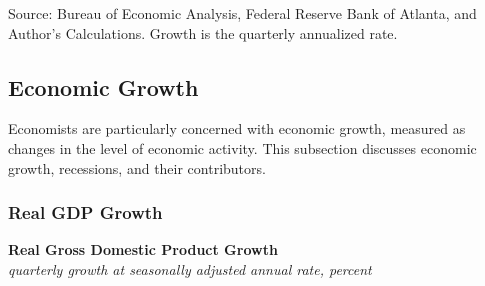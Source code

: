 \documentclass{report}
\makeatletter
\newcommand{\tbllink}[1]{\href{https://raw.githubusercontent.com/bdecon/US-chartbook/master/chartbook/data/#1}{\faTable}}
\newcommand*\short[1]{\expandafter\@gobbletwo\number\numexpr#1\relax}
\newcommand{\tsbar}[4]{
		\addplot[ybar stacked, bar width=2.1pt, draw opacity=0, fill=#1] 
			table [x=#2, y=#3, col sep=comma]{#4};}
\newcommand{\absnode}[3]{\node[below right, align=left] at (axis cs: #1,#2) {#3};}
\newcommand{\dateaxisticks}{
		date coordinates in=x, axis line style={draw=none},
		xmax={2023-10-01},
		max space between ticks=40,	    
		xtick={{1990-01-01}, {1992-01-01}, {1994-01-01}, 
			{1996-01-01}, {1998-01-01}, {2000-01-01}, 
			{2002-01-01}, {2004-01-01}, {2006-01-01},
			{2008-01-01}, {2010-01-01}, {2012-01-01}, {2014-01-01},
		    {2016-01-01}, {2018-01-01}, {2020-01-01}, {2022-01-01}, 
		    {2024-01-01}, {2026-01-01}},
		minor xtick={{1989-01-01}, {1991-01-01}, {1993-01-01},
			{1995-01-01}, {1997-01-01}, {1999-01-01}, 
			{2001-01-01}, {2003-01-01}, {2005-01-01}, {2007-01-01},
		    {2009-01-01}, {2011-01-01}, {2013-01-01}, {2015-01-01},
		    {2017-01-01}, {2019-01-01}, {2021-01-01}, {2023-01-01}, 
		    {2025-01-01}, {2027-01-01}},
		enlarge y limits={0.06}, enlarge x limits={0.01},
		}
\newcommand{\bbar}[2]{extra #1 ticks = {{#2}}, extra #1 tick labels = ,
		extra #1 tick style = {grid=major, grid style={thick, black!25}},}
\newcommand{\rbars}{
		\fill[color=black!10] (axis cs:{1990-07-01},\pgfkeysvalueof{/pgfplots/ymin}) rectangle 
			(axis cs:{1991-03-01}, \pgfkeysvalueof{/pgfplots/ymax});
		\fill[color=black!10] (axis cs:{2007-12-01},\pgfkeysvalueof{/pgfplots/ymin}) rectangle 
			(axis cs:{2009-07-01}, \pgfkeysvalueof{/pgfplots/ymax});
		\fill[color=black!10] (axis cs:{2001-03-01},\pgfkeysvalueof{/pgfplots/ymin}) rectangle 
			(axis cs:{2001-11-01}, \pgfkeysvalueof{/pgfplots/ymax});
		\fill[color=black!10] (axis cs:{2020-02-01},\pgfkeysvalueof{/pgfplots/ymin}) rectangle 
			(axis cs:{2020-05-01}, \pgfkeysvalueof{/pgfplots/ymax});}
\makeatother
\begin{document}
\begin{minipage}{0.68\textwidth}		
\footnotesize{Source: Bureau of Economic Analysis, Federal Reserve Bank of Atlanta, and Author's Calculations. Growth is the quarterly annualized rate.}\end{minipage} \hspace{1mm} \begin{minipage}{0.07\textwidth}\hfill \tbllink{gdpjobslvl.csv} \vspace{4mm} \end{minipage}
\newpage
\hypertarget{oegr}{\label{oegr}}
\vspace*{-10mm}

\begin{minipage}{0.76\textwidth} 
\subsection*{Economic Growth}
\small Economists are particularly concerned with economic growth, measured as changes in the level of economic activity. This subsection discusses economic growth, recessions, and their contributors.

\subsubsection*{Real GDP Growth} 
\vspace{-1mm}

\small  
\vspace{1mm}

\normalsize \textbf{Real Gross Domestic Product Growth}\\
\footnotesize{\textit{quarterly growth at seasonally adjusted annual rate, percent}}
\vspace{-5mm}

\hspace*{-2mm} 
\vspace{-3.5mm}


\end{minipage}
\end{document}

